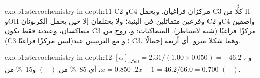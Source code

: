 \begin{solution}{exo:b1:stereochemistry-in-depth:11}
C2 وC4 مركزان فراغيان. ويحمل C3 كلًّا من H وOH وفرعين
متماثلين في البنية؛ ولا يختلفان إلا حين يحمل الكربونان C2 وC4 واصفين
متعاكسان، وعندئذ فقط يكون C3 مركزًا فراغيًا (شبه لامتناظر). المتماكبات:
 و، زوج من  (C3 ليس مركزًا فراغيًا)؛
و مع الترتيبين عند C3، وهما شكلا ميزو. أي أربعة إجمالًا.
\end{solution}

\begin{solution}{exo:b1:stereochemistry-in-depth:12}
$[\alpha]_{\text{العيّنة}} = 2.31/(1.00 \times 0.050) = +46.2^\circ$،
و$2x - 1 = 46.2/66.0 = 0.700$: $x = 0.850$، أي \qty{85}{\percent} من
 $(+)$ و\qty{15}{\percent} من $(-)$.
\end{solution}

